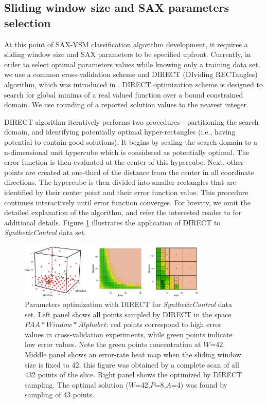 \documentclass[conference]{IEEEtran}
\newcommand{\myfigureshrinker}{\vspace{0.05cm}}
\begin{document}
\subsection{Sliding window size and SAX parameters selection} \label{section-direct}
At this point of SAX-VSM classification algorithm development, it requires a sliding 
window size and SAX parameters to be specified upfront. 
Currently, in order to select optimal parameters values while knowing only a 
training data set, we use a common cross-validation scheme and DIRECT (DIviding RECTangles) 
algorithm, which was introduced in \cite{direct-original}.
DIRECT optimization scheme is designed to search for global minima of a real valued function 
over a bound constrained domain. We use rounding of a reported solution values 
to the nearest integer.

DIRECT algorithm iteratively performs two procedures - partitioning the search domain, 
and identifying potentially optimal hyper-rectangles (i.e., having potential to contain good
solutions). 
It begins by scaling the search domain to a n-dimensional unit hypercube which is considered 
as potentially optimal. The error function is then evaluated at the center of this hypercube. Next, 
other points are created at one-third of the distance from the center in all coordinate directions. 
The hypercube is then divided into smaller rectangles that are identified by their center point 
and their error function value. This procedure continues interactively until error function
converges.
For brevity, we omit the detailed explanation of the algorithm, and refer the 
interested reader to \cite{direct} for additional details. Figure  \ref{fig:direct-sampling} 
illustrates the application of DIRECT to \textit{SyntheticControl} data set.

\begin{figure}[t]
   \myfigureshrinker
   \centering
   \includegraphics[width=90mm]{figures/figure_direct.eps}
   \caption{Parameters optimization with DIRECT for \textit{SyntheticControl} data set. 
   Left panel shows all points sampled by DIRECT in the space $PAA*Window*Alphabet$:
   red points correspond to high error values in cross-validation experiments, 
   while green points indicate low error values. 
   Note the green points concentration at $W$=42. 
   Middle panel shows an error-rate heat map when the sliding window size is fixed to 42; 
   this figure was obtained by a complete scan of all 432 points of the slice. 
   Right panel shows the optimized by DIRECT sampling. The optimal solution 
   ($W$=42,$P$=8,$A$=4) was found by sampling of 43 points.}
   \label{fig:direct-sampling}
\end{figure}
\end{document}
